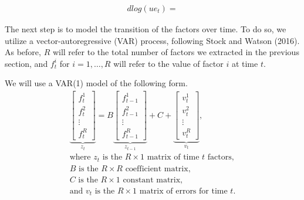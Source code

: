 \documentclass[11pt, letterpaper]{article}\usepackage[]{graphicx}\usepackage[]{color}
\newcommand{\vv}[1]{\textcolor{black}{\mathbf{#1}}}
\begin{document}



\begin{align*}
    dlog(ue_t) = 
\end{align*}

The next step is to model the transition of the factors over time. To do so, we utilize a vector-autoregressive (VAR) process, following Stock and Watson (2016). As before, $R$ will refer to the total number of factors we extracted in the previous section, and $f^i_t$ for $i = 1, \dots, R$ will refer to the value of factor $i$ at time $t$.

We will use a VAR(1) model of the following form.
\begin{align*}
\underbrace{\begin{bmatrix}
	f^1_{t}\\
	f^2_{t}\\
	\vdots \\
	f^R_{t}
\end{bmatrix}}_{z_t}
=
B
\underbrace{\begin{bmatrix}
	f^1_{t-1}\\
	f^2_{t-1}\\
	\vdots \\
	f^R_{t-1}
\end{bmatrix}}_{z_{t-1}}
+
C
+
\underbrace{\begin{bmatrix}
v^1_t\\
v^2_t\\
\vdots\\
v^R_t
\end{bmatrix}}_{v_t},\\
\text{where $z_t$ is the $R \times 1$ matrix of time $t$ factors,}\\
\text{$B$ is the $R \times R$ coefficient matrix,}\\
\text{$C$ is the $R \times 1$ constant matrix,}\\
\text{and $v_t$ is the $R \times 1$ matrix of errors for time $t$.}
\end{align*}
\end{document}
